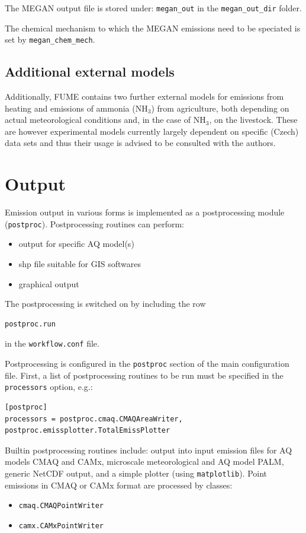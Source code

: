 \documentclass[a4paper,11pt]{article}
\begin{document}
The MEGAN output file is stored under:
\verb|megan_out| in the \verb|megan_out_dir| folder.

The chemical mechanism to which the MEGAN emissions need to be speciated is set by \verb|megan_chem_mech|.

\subsection{Additional external models}
Additionally, FUME contains two further external models for emissions from heating and emissions of ammonia (NH$_3$) from agriculture, both depending on actual meteorological conditions and, in the case of NH$_3$, on the livestock. These are however experimental models currently largely dependent on specific (Czech) data sets and thus their usage is advised to be consulted with the authors.

\section{Output}\label{output}
Emission output in various forms is implemented as a postprocessing
module (\verb|postproc|). Postprocessing routines can perform:
\begin{itemize}
\item output for specific AQ model(s)
\item shp file suitable for GIS softwares
\item graphical output
\end{itemize}

The postprocessing is switched on by including the row
\begin{verbatim}
postproc.run 
\end{verbatim}
in the \verb|workflow.conf| file.

Postprocessing is configured in the \verb|postproc| section of the
main configuration file. First, a list of postprocessing routines to be
run must be specified in the \verb|processors| option, e.g.:
\begin{verbatim}
[postproc]
processors = postproc.cmaq.CMAQAreaWriter, postproc.emissplotter.TotalEmissPlotter
\end{verbatim}

Builtin postprocessing routines include: output into input emission
files for AQ models CMAQ and CAMx, microscale meteorological and AQ model PALM, generic NetCDF output, and a simple plotter (using \verb|matplotlib|). Point emissions in CMAQ or CAMx format are processed by classes:
\begin{itemize}
\item
  \verb|cmaq.CMAQPointWriter|
\item
  \verb|camx.CAMxPointWriter|
\end{itemize}
\end{document}
